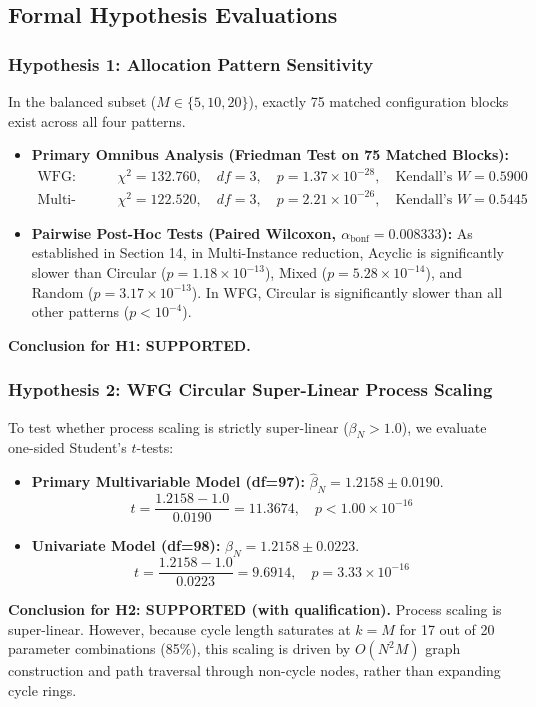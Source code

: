 \documentclass[11pt,a4paper]{article}
\begin{document}
\subsection{Formal Hypothesis Evaluations}

\subsubsection{Hypothesis 1: Allocation Pattern Sensitivity}
In the balanced subset ($M \in \{5, 10, 20\}$), exactly 75 matched configuration blocks exist across all four patterns.
\begin{itemize}
    \item \textbf{Primary Omnibus Analysis (Friedman Test on 75 Matched Blocks):}
    \begin{align}
        \text{WFG:} \quad &\chi^2 = 132.760, \quad df = 3, \quad p = 1.37 \times 10^{-28}, \quad \text{Kendall's } W = 0.5900 \\
        \text{Multi-Instance:} \quad &\chi^2 = 122.520, \quad df = 3, \quad p = 2.21 \times 10^{-26}, \quad \text{Kendall's } W = 0.5445
    \end{align}
    \item \textbf{Pairwise Post-Hoc Tests (Paired Wilcoxon, $\alpha_{\text{bonf}} = 0.008333$):}
    As established in Section 14, in Multi-Instance reduction, Acyclic is significantly slower than Circular ($p = 1.18 \times 10^{-13}$), Mixed ($p = 5.28 \times 10^{-14}$), and Random ($p = 3.17 \times 10^{-13}$). In WFG, Circular is significantly slower than all other patterns ($p < 10^{-4}$).
\end{itemize}
\textbf{Conclusion for H1: SUPPORTED.}

\subsubsection{Hypothesis 2: WFG Circular Super-Linear Process Scaling}
To test whether process scaling is strictly super-linear ($\beta_N > 1.0$), we evaluate one-sided Student's $t$-tests:
\begin{itemize}
    \item \textbf{Primary Multivariable Model (df=97):} $\hat{\beta}_N = 1.2158 \pm 0.0190$.
    \begin{equation}
        t = \frac{1.2158 - 1.0}{0.0190} = 11.3674, \quad p < 1.00 \times 10^{-16}
    \end{equation}
    \item \textbf{Univariate Model (df=98):} $\hat{\beta}_N = 1.2158 \pm 0.0223$.
    \begin{equation}
        t = \frac{1.2158 - 1.0}{0.0223} = 9.6914, \quad p = 3.33 \times 10^{-16}
    \end{equation}
\end{itemize}
\textbf{Conclusion for H2: SUPPORTED (with qualification).} Process scaling is super-linear. However, because cycle length saturates at $k=M$ for 17 out of 20 parameter combinations (85\%), this scaling is driven by $O(N^2 M)$ graph construction and path traversal through non-cycle nodes, rather than expanding cycle rings.
\end{document}

